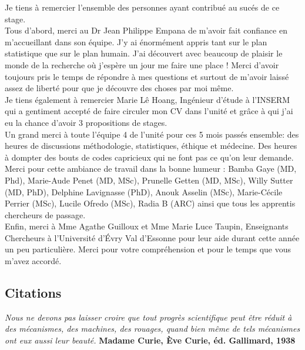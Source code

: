 \documentclass{book}
\begin{document}
\noindent
Je tiens à remercier l'ensemble des personnes ayant contribué au sucés de ce stage.\\

\noindent
Tous d'abord, merci au Dr Jean Philippe Empana de m'avoir fait confiance en m'accueillant dans son équipe. 
J'y ai énormément appris tant sur le plan statistique que sur le plan humain. J'ai découvert avec beaucoup de plaisir le monde de la recherche où j'espère un jour me faire une place !
Merci d'avoir toujours pris le temps de répondre à mes questions et surtout de m'avoir laissé assez de liberté pour que je découvre des choses par moi même.\\

\noindent
Je tiens également à remercier Marie Lê Hoang, Ingénieur d'étude à l'INSERM qui a gentiment accepté de faire circuler mon CV dans l'unité et grâce à qui j'ai eu la chance d'avoir 3 propositions de stages.\\

\noindent
Un grand merci à toute l'équipe 4 de l'unité pour ces 5 mois passés ensemble: des heures de discussions méthodologie, statistiques, éthique et médecine. Des heures à dompter des bouts de codes capricieux qui ne font pas ce qu'on leur demande.\\
Merci pour cette ambiance de travail dans la bonne humeur : Bamba Gaye (MD, Phd), Marie-Aude Penet (MD, MSc), Prunelle Getten (MD, MSc), Willy Sutter (MD, PhD), Delphine Lavignasse (PhD), Anouk Asselin (MSc), Marie-Cécile Perrier (MSc), Lucile Ofredo (MSc), Radia B (ARC) ainsi que tous les apprentis chercheurs de passage.\\

\noindent
Enfin, merci à Mme Agathe Guilloux et Mme Marie Luce Taupin, Enseignants Chercheurs à l'Université d'Évry Val 
d'Essonne pour leur aide durant cette année un peu particulière. Merci pour votre compréhension et pour le temps que vous m'avez accordé.


\newpage
\begin{center}
\section*{Citations}
\end{center} 

\bigskip


\begin{flushright}
\textit{Nous ne devons pas laisser croire que tout progrès scientifique peut être réduit à des mécanismes, des machines, des rouages, quand bien même de tels mécanismes ont eux aussi leur beauté.}
\textbf{Madame Curie, Ève Curie, éd. Gallimard, 1938}
\end{flushright}
\end{document}
